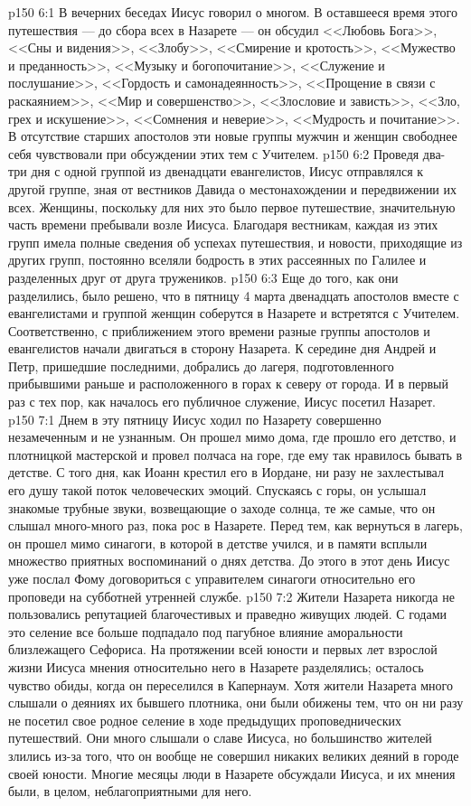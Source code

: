 \vs p150 6:1 В вечерних беседах Иисус говорил о многом. В оставшееся время этого путешествия --- до сбора всех в Назарете --- он обсудил <<Любовь Бога>>, <<Сны и видения>>, <<Злобу>>, <<Смирение и кротость>>, <<Мужество и преданность>>, <<Музыку и богопочитание>>, <<Служение и послушание>>, <<Гордость и самонадеянность>>, <<Прощение в связи с раскаянием>>, <<Мир и совершенство>>, <<Злословие и зависть>>, <<Зло, грех и искушение>>, <<Сомнения и неверие>>, <<Мудрость и почитание>>. В отсутствие старших апостолов эти новые группы мужчин и женщин свободнее себя чувствовали при обсуждении этих тем с Учителем.
\vs p150 6:2 Проведя два\hyp{}три дня с одной группой из двенадцати евангелистов, Иисус отправлялся к другой группе, зная от вестников Давида о местонахождении и передвижении их всех. Женщины, поскольку для них это было первое путешествие, значительную часть времени пребывали возле Иисуса. Благодаря вестникам, каждая из этих групп имела полные сведения об успехах путешествия, и новости, приходящие из других групп, постоянно вселяли бодрость в этих рассеянных по Галилее и разделенных друг от друга тружеников.
\vs p150 6:3 Еще до того, как они разделились, было решено, что в пятницу 4 марта двенадцать апостолов вместе с евангелистами и группой женщин соберутся в Назарете и встретятся с Учителем. Соответственно, с приближением этого времени разные группы апостолов и евангелистов начали двигаться в сторону Назарета. К середине дня Андрей и Петр, пришедшие последними, добрались до лагеря, подготовленного прибывшими раньше и расположенного в горах к северу от города. И в первый раз с тех пор, как началось его публичное служение, Иисус посетил Назарет.
\vs p150 7:1 Днем в эту пятницу Иисус ходил по Назарету совершенно незамеченным и не узнанным. Он прошел мимо дома, где прошло его детство, и плотницкой мастерской и провел полчаса на горе, где ему так нравилось бывать в детстве. С того дня, как Иоанн крестил его в Иордане, ни разу не захлестывал его душу такой поток человеческих эмоций. Спускаясь с горы, он услышал знакомые трубные звуки, возвещающие о заходе солнца, те же самые, что он слышал много\hyp{}много раз, пока рос в Назарете. Перед тем, как вернуться в лагерь, он прошел мимо синагоги, в которой в детстве учился, и в памяти всплыли множество приятных воспоминаний о днях детства. До этого в этот день Иисус уже послал Фому договориться с управителем синагоги относительно его проповеди на субботней утренней службе.
\vs p150 7:2 Жители Назарета никогда не пользовались репутацией благочестивых и праведно живущих людей. С годами это селение все больше подпадало под пагубное влияние аморальности близлежащего Сефориса. На протяжении всей юности и первых лет взрослой жизни Иисуса мнения относительно него в Назарете разделялись; осталось чувство обиды, когда он переселился в Капернаум. Хотя жители Назарета много слышали о деяниях их бывшего плотника, они были обижены тем, что он ни разу не посетил свое родное селение в ходе предыдущих проповеднических путешествий. Они много слышали о славе Иисуса, но большинство жителей злились из\hyp{}за того, что он вообще не совершил никаких великих деяний в городе своей юности. Многие месяцы люди в Назарете обсуждали Иисуса, и их мнения были, в целом, неблагоприятными для него.
